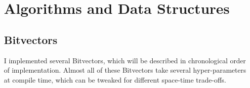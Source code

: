 \documentclass[a4paper,UKenglish,cleveref, autoref, thm-restate]{lipics-v2021}
\newcommand{\stress}[1] {\textit{#1}}
\begin{document}



\section{Algorithms and Data Structures}
\label{ch:FirstContentSection}
\subsection{Bitvectors}
I implemented several Bitvectors, which will be described in chronological order of implementation.
Almost all of these Bitvectors take several hyper-parameters at compile time,
which can be tweaked for different space-time trade-offs.
\end{document}
